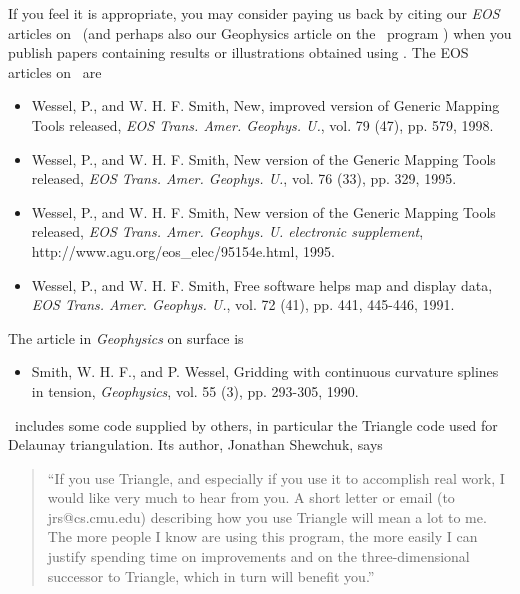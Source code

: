 If you feel it is appropriate, you may consider paying us back by
citing our {\it EOS} articles on \GMT\ (and perhaps also our Geophysics
article on the \GMT\ program ) when you publish papers
containing results or illustrations obtained using \GMT.  The EOS
articles on \GMT\ are \\
%
%

\begin{itemize}

\item{Wessel, P., and W. H. F. Smith, New, improved version of Generic
Mapping Tools released, {\it EOS Trans. Amer. Geophys. U.}, vol. 79
(47), pp. 579, 1998.}

\item{Wessel, P., and W. H. F. Smith, New version of the Generic
Mapping Tools released, {\it EOS Trans. Amer. Geophys. U.}, vol. 76
(33), pp. 329, 1995.}

\item{Wessel, P., and W. H. F. Smith, New version of the Generic
Mapping Tools released, {\it EOS Trans. Amer. Geophys. U. electronic
supplement}, 
{http://www.agu.org/eos\_elec/95154e.html}, 1995.}

\item{Wessel, P., and W. H. F. Smith, Free software helps map and
display data, {\it EOS Trans. Amer. Geophys. U.}, vol. 72 (41),
pp. 441, 445-446, 1991.}

\end{itemize}

The article in {\it Geophysics} on surface is
%
%
\begin{itemize}

\item{Smith, W. H. F., and P. Wessel, Gridding with continuous
curvature splines in tension, {\it Geophysics}, vol. 55 (3), pp.
293-305, 1990.}

\end{itemize}

\GMT\ includes some code supplied by others, in particular the Triangle code
used for Delaunay triangulation.  Its author, Jonathan Shewchuk, says
\begin{quote}
``If you use Triangle, and especially if you use it to accomplish real
work, I would like very much to hear from you.  A short letter or email
(to jrs@cs.cmu.edu) describing how you use Triangle will mean a lot to
me.  The more people I know are using this program, the more easily I can
justify spending time on improvements and on the three-dimensional
successor to Triangle, which in turn will benefit you.''
\end{quote}

